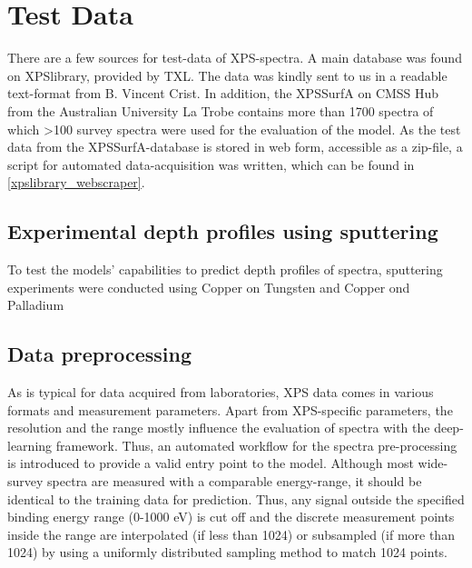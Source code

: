 \label{test_data}
\section{Test Data}

There are a few sources for test-data of XPS-spectra. A main database was found on XPSlibrary, provided by TXL. The data was kindly sent to us in a readable text-format from B. Vincent Crist. 
In addition, the XPSSurfA on CMSS Hub from the Australian University La Trobe contains more than 1700 spectra of which >100 survey spectra were used for the evaluation of the model. As the test data from the XPSSurfA-database is stored in web form, accessible as a zip-file, a script for automated data-acquisition was written, which can be found in \ref{xpslibrary_webscraper}.


\subsection{Experimental depth profiles using sputtering}
To test the models' capabilities to predict depth profiles of spectra, sputtering experiments were conducted using Copper on Tungsten and Copper ond Palladium


\subsection{Data preprocessing}

As is typical for data acquired from laboratories, XPS data comes in various formats and measurement parameters. Apart from XPS-specific parameters, the resolution and the range mostly influence the evaluation of spectra with the deep-learning framework. Thus, an automated workflow for the spectra pre-processing is introduced to provide a valid entry point to the model.
Although most wide-survey spectra are measured with a comparable energy-range, it should be identical to the training data for prediction. Thus, any signal outside the specified binding energy range (0-1000 eV) is cut off and the discrete measurement points inside the range are interpolated (if less than 1024) or subsampled (if more than 1024) by using a uniformly distributed sampling method to match 1024 points.

